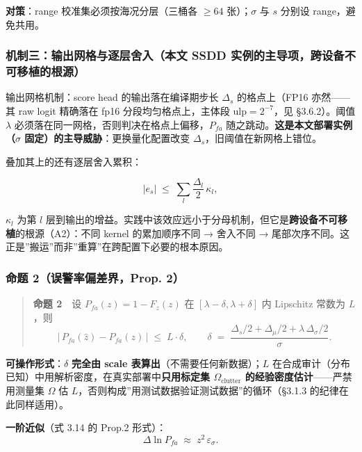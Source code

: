 \textbf{对策}：range 校准集必须按海况分层（三桶各 \(\ge 64\)
张）；\(\sigma\) 与 \(s\) 分别设 range，避免共用。

\subsubsection{机制三：输出网格与逐层舍入（本文 SSDD
实例的主导项，跨设备不可移植的根源）}\label{ux673aux5236ux4e09ux8f93ux51faux7f51ux683cux4e0eux9010ux5c42ux820dux5165ux672cux6587-ssdd-ux5b9eux4f8bux7684ux4e3bux5bfcux9879ux8de8ux8bbeux5907ux4e0dux53efux79fbux690dux7684ux6839ux6e90}

输出网格机制：score head 的输出落在编译期步长 \(\Delta_s\)
的格点上（FP16 亦然------其 raw logit 精确落在 fp16
分段均匀格点上，主体段 \(\mathrm{ulp}=2^{-7}\)，见 §3.6.2）。阈值
\(\lambda\) 必须落在同一网格，否则判决在格点上偏移，\(P_{fa}\)
随之跳动。\textbf{这是本文部署实例（\(\sigma\)
固定）的主导威胁}：更换量化配置改变 \(\Delta_s\)，旧阈值在新网格上错位。

叠加其上的还有逐层舍入累积：

\[
|e_s| \;\le\; \sum_{l}\frac{\Delta_l}{2}\,\kappa_l,
\tag{3.17}
\]

\(\kappa_l\) 为第 \(l\)
层到输出的增益。实践中该效应远小于分母机制，但它是\textbf{跨设备不可移植}的根源（A2）：不同
kernel 的累加顺序不同 → 舍入不同 →
尾部次序不同。这正是''搬运''而非''重算''在跨配置下必要的根本原因。

\subsubsection{命题 2（误警率偏差界，Prop.
2）}\label{ux547dux9898-2ux8befux8b66ux7387ux504fux5deeux754cprop.-2}

\begin{quote}
\textbf{命题 2}　设 \(P_{fa}(z)=1-F_z(z)\) 在
\([\lambda-\delta,\lambda+\delta]\) 内 Lipschitz 常数为 \(L\)，则 \[
\big|\,P_{fa}(\hat z)-P_{fa}(z)\,\big| \;\le\; L\cdot\delta,
\qquad
\delta \;=\; \frac{\Delta_s/2+\Delta_\mu/2+\lambda\,\Delta_\sigma/2}{\sigma}.
\tag{3.18}
\]
\end{quote}

\textbf{可操作形式}：\(\delta\) \textbf{完全由 scale
表算出}（不需要任何新数据）；\(L\)
在合成审计（分布已知）中用解析密度，在真实部署中\textbf{只用标定集
\(\Omega_{\mathrm{clutter}}\) 的经验密度估计}------严禁用测量集
\(\Omega\) 估 \(L\)，否则构成''用测试数据验证测试数据''的循环（§3.1.3
的纪律在此同样适用）。

\textbf{一阶近似}（式 3.14 的 Prop.2 形式）： \[
\Delta\ln P_{fa}\;\approx\;z^{2}\,\varepsilon_\sigma .
\tag{3.19}
\]

